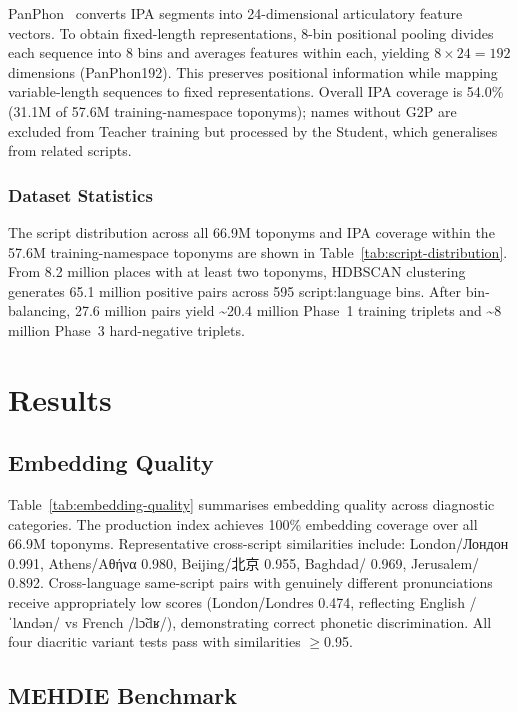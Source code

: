 \documentclass[11pt,a4paper]{article}
\newcommand{\textar}[1]{{\arabicfont\RL{#1}}}
\newcommand{\textcn}[1]{{\chinesefont #1}}
\newcommand{\texthebrew}[1]{{\hebrewfont\RL{#1}}}
\begin{document}
PanPhon~\citep{mortensen2016} converts IPA segments into 24-dimensional articulatory feature vectors. To obtain fixed-length representations, 8-bin positional pooling divides each sequence into 8 bins and averages features within each, yielding $8 \times 24 = 192$ dimensions (PanPhon192). This preserves positional information while mapping variable-length sequences to fixed representations. Overall IPA coverage is 54.0\% (31.1M of 57.6M training-namespace toponyms); names without G2P are excluded from Teacher training but processed by the Student, which generalises from related scripts.

\subsubsection{Dataset Statistics}

The script distribution across all 66.9M toponyms and IPA coverage within the 57.6M training-namespace toponyms are shown in Table~\ref{tab:script-distribution}. From 8.2 million places with at least two toponyms, HDBSCAN clustering generates 65.1 million positive pairs across 595 script:language bins. After bin-balancing, 27.6 million pairs yield \~{}20.4 million Phase~1 training triplets and \~{}8 million Phase~3 hard-negative triplets.


\section{Results}
\label{sec:results}

\subsection{Embedding Quality}

Table~\ref{tab:embedding-quality} summarises embedding quality across diagnostic categories. The production index achieves 100\% embedding coverage over all 66.9M toponyms. Representative cross-script similarities include: London/Лондон 0.991, Athens/Αθήνα 0.980, Beijing/\textcn{北京} 0.955, Baghdad/\textar{بغداد} 0.969, Jerusalem/\texthebrew{ירושלים} 0.892. Cross-language same-script pairs with genuinely different pronunciations receive appropriately low scores (London/Londres 0.474, reflecting English /ˈlʌndən/ vs French /lɔ̃dʁ/), demonstrating correct phonetic discrimination. All four diacritic variant tests pass with similarities $\geq$0.95.

\subsection{MEHDIE Benchmark}
\end{document}
